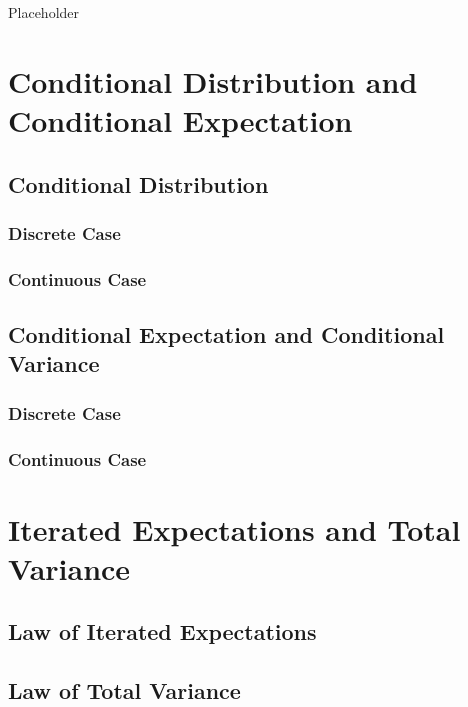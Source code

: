 \documentclass[]{book}
\theoremstyle{definition}
\theoremstyle{definition}
\theoremstyle{definition}
\theoremstyle{remark}
\begin{document}
Placeholder

\section{Conditional Distribution and Conditional
Expectation}\label{S:AppB:CD}

\subsection{Conditional Distribution}\label{conditional-distribution}

\subsubsection{Discrete Case}\label{discrete-case}

\subsubsection{Continuous Case}\label{continuous-case}

\subsection{Conditional Expectation and Conditional
Variance}\label{conditional-expectation-and-conditional-variance}

\subsubsection{Discrete Case}\label{discrete-case-1}

\subsubsection{Continuous Case}\label{continuous-case-1}

\section{Iterated Expectations and Total Variance}\label{S:AppB:IE}

\subsection{Law of Iterated
Expectations}\label{law-of-iterated-expectations}

\subsection{Law of Total Variance}\label{law-of-total-variance}
\end{document}
